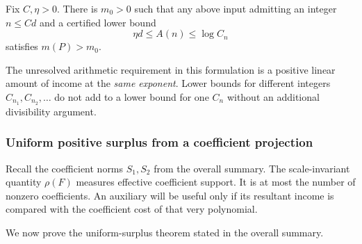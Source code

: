 \begin{corollary}\label{ar:same-exponent}
Fix $C,\eta>0$.
There is $m_0>0$ such that any above input admitting an integer $n\le Cd$ and a certified lower bound
\[
 \eta d\le A(n)\le\log C_n
\]
satisfies $m(P)>m_0$.
\end{corollary}

The unresolved arithmetic requirement in this formulation is a positive linear amount of income at the \emph{same exponent}.
Lower bounds for different integers $C_{n_1},C_{n_2},\ldots$ do not add to a lower bound for one $C_n$ without an additional divisibility argument.

\subsubsection{Uniform positive surplus from a coefficient projection}
\label{ar:auxiliary}

Recall the coefficient norms $S_1,S_2$ from the overall summary.
The scale-invariant quantity $\rho(F)$ measures effective coefficient support.
It is at most the number of nonzero coefficients.
An auxiliary will be useful only if its resultant income is compared with the coefficient cost of that very polynomial.

We now prove the uniform-surplus theorem stated in the overall summary.


